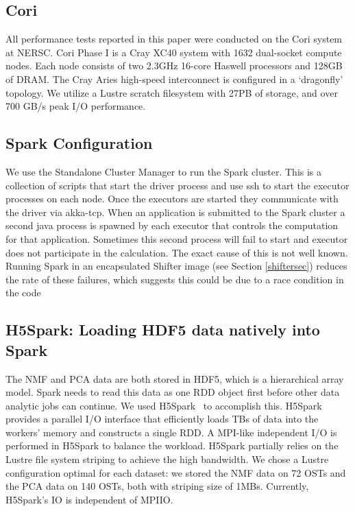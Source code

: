 \subsection{Cori}
All performance tests reported in this paper were conducted on the Cori system at NERSC. Cori Phase I is a Cray XC40 system with 1632 dual-socket compute nodes. Each node consists of two 2.3GHz 16-core Haswell processors and 128GB of DRAM. The Cray Aries high-speed interconnect is configured in a `dragonfly' topology. We utilize a Lustre scratch filesystem with 27PB of storage, and over 700 GB/s peak I/O performance. 

\subsection{Spark Configuration}
We use the Standalone Cluster Manager to run the Spark cluster. This is a collection of scripts that start the driver process and use ssh to start the executor processes on each node. Once the executors are started they communicate with the driver via akka-tcp. When an application is submitted to the Spark cluster a second java process is spawned by each executor that controls the computation for that application. Sometimes this second process will fail to start and executor does not participate in the calculation. The exact cause of this is not well known. Running Spark in an encapsulated Shifter image (see Section \ref{shiftersec}) reduces the rate of these failures, which suggests this could be due to a race condition in the code

\subsection{H5Spark: Loading HDF5 data natively into Spark}
The NMF and PCA data are both stored in HDF5, which is a hierarchical array model. Spark needs to read this data as one RDD object first before other data analytic jobs can continue. We used H5Spark~\cite{h5spark-cug16} to accomplish this. H5Spark provides a parallel I/O interface that efficiently loads TBs of data into the workers' memory and constructs a single RDD. A MPI-like independent I/O is performed in H5Spark to balance the workload. H5Spark partially relies on the Lustre file system striping to achieve the high bandwidth. We chose a Lustre configuration optimal for each dataset: we stored the NMF data on 72 OSTs and the PCA data on 140 OSTs, both with striping size of 1MBs. Currently, H5Spark's IO is independent of MPIIO.

